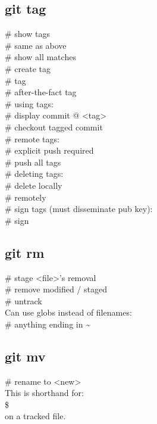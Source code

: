 \subsection*{git tag}
 \# show tags \\
 \# same as above\\
 \# show all matches \\
 \# create  tag \\
 \#  tag \\
 \# after-the-fact tag \\
\# using tags:\\
 \# display commit @ <tag>\\
 \# checkout tagged commit \\
\# remote tags:\\
 \# explicit push required \\
 \# push all tags \\
\# deleting tags: \\
 \# delete locally \\
 \# remotely \\
\# sign tags (must disseminate pub key): \\
 \# sign

\subsection*{git rm}
 \# stage <file>'s removal \\
 \# remove modified / staged \\
 \# untrack \\
Can use globs instead of filenames:\\
 \# anything ending in \textasciitilde

\subsection*{git mv}
 \# rename to <new>\\
This is shorthand for:\\
\$  \\
on a tracked file.


